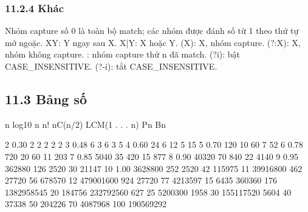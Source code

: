 \documentclass[11pt]{article}
\begin{document}
\subsubsection{11.2.4 Khác}
\begin{NoteBlock}
Nhóm capture số 0 là toàn bộ match; các nhóm được đánh số từ 1 theo thứ tự mở ngoặc.
XY: Y ngay sau X.
X|Y: X hoặc Y.
(X): X, nhóm capture.
(?:X): X, nhóm không capture.
\n: nhóm capture thứ n đã match.
(?i): bật CASE_INSENSITIVE.
(?-i): tắt CASE_INSENSITIVE.
\end{NoteBlock}
\subsection{11.3 Bảng số}
\begin{NoteBlock}
n log10 n n! nC(n/2) LCM(1 . . . n) Pn Bn
\end{NoteBlock}
\begin{Code}
2 0.30 2 2 2 2 2
3 0.48 6 3 6 3 5
4 0.60 24 6 12 5 15
5 0.70 120 10 60 7 52
6 0.78 720 20 60 11 203
7 0.85 5040 35 420 15 877
8 0.90 40320 70 840 22 4140
9 0.95 362880 126 2520 30 21147
10 1.00 3628800 252 2520 42 115975
11 39916800 462 27720 56 678570
12 479001600 924 27720 77 4213597
15 6435 360360 176 1382958545
20 184756 232792560 627
25 5200300 1958
30 155117520 5604
40 37338
50 204226
70 4087968
100 190569292
\end{Code}
\end{document}
